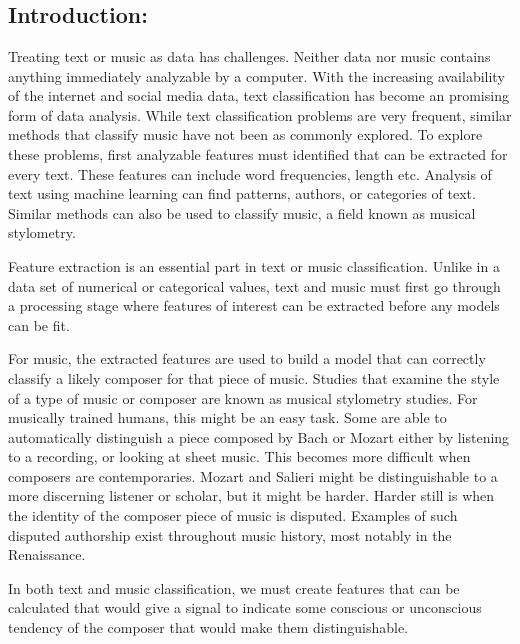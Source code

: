\documentclass[12pt,twoside]{reedthesis}
\theoremstyle{definition}
\theoremstyle{definition}
\theoremstyle{definition}
\theoremstyle{remark}
\begin{document}
\chapter{}\label{section}

\section{Introduction:}\label{introduction}

Treating text or music as data has challenges. Neither data nor music
contains anything immediately analyzable by a computer. With the
increasing availability of the internet and social media data, text
classification has become an promising form of data analysis. While text
classification problems are very frequent, similar methods that classify
music have not been as commonly explored. To explore these problems,
first analyzable features must identified that can be extracted for
every text. These features can include word frequencies, length etc.
Analysis of text using machine learning can find patterns, authors, or
categories of text. Similar methods can also be used to classify music,
a field known as musical stylometry.

Feature extraction is an essential part in text or music classification.
Unlike in a data set of numerical or categorical values, text and music
must first go through a processing stage where features of interest can
be extracted before any models can be fit.

For music, the extracted features are used to build a model that can
correctly classify a likely composer for that piece of music. Studies
that examine the style of a type of music or composer are known as
musical stylometry studies. For musically trained humans, this might be
an easy task. Some are able to automatically distinguish a piece
composed by Bach or Mozart either by listening to a recording, or
looking at sheet music. This becomes more difficult when composers are
contemporaries. Mozart and Salieri might be distinguishable to a more
discerning listener or scholar, but it might be harder. Harder still is
when the identity of the composer piece of music is disputed. Examples
of such disputed authorship exist throughout music history, most notably
in the Renaissance.

In both text and music classification, we must create features that can
be calculated that would give a signal to indicate some conscious or
unconscious tendency of the composer that would make them
distinguishable.
\end{document}

